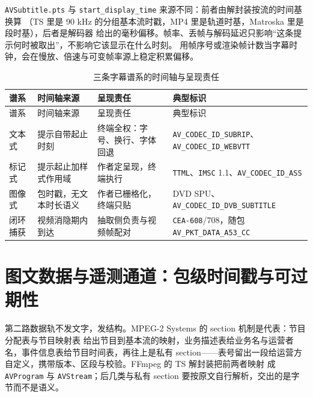 \documentclass[12pt,a4paper,fontset=fandol]{ctexbook}
\newcommand{\Tp}[1]{\texttt{#1}}
\newcommand{\Bk}{\discretionary{}{}{}}
\begin{document}
\begin{warning}[title={字幕的时间基来自容器，不来自帧}]
\Tp{AVSubtitle.pts} 与 \Tp{start\_display\_time} 来源不同：前者由解封装按流的时间基换算
（TS 里是 90 kHz 的分组基本流时戳，MP4 里是轨道时基，Matroska 里是段时基），后者是解码器
给出的毫秒偏移。帧率、丢帧与解码延迟只影响``这条提示何时被取出''，不影响它该显示在什么时刻。
用帧序号或渲染帧计数当字幕时钟，会在慢放、倍速与可变帧率源上稳定积累偏移。
\end{warning}

\begin{longtable}{@{}>{\raggedright\arraybackslash\footnotesize}p{} >{\raggedright\arraybackslash\footnotesize}p{} >{\raggedright\arraybackslash\footnotesize}p{} >{\raggedright\arraybackslash\footnotesize}p{}@{}}
\caption{三条字幕谱系的时间轴与呈现责任}\label{tab:ch15-lineage} \\
\toprule
谱系 & 时间轴来源 & 呈现责任 & 典型标识 \\
\midrule
\endfirsthead
\toprule
谱系 & 时间轴来源 & 呈现责任 & 典型标识 \\
\midrule
\endhead
\bottomrule
\endfoot
\endlastfoot
文本式 & 提示自带起止时刻 & 终端全权：字号、换行、字体回退 & \Tp{AV{\Bk}\_CODEC{\Bk}\_ID{\Bk}\_SUBRIP}、\Tp{AV{\Bk}\_CODEC{\Bk}\_ID{\Bk}\_WEBVTT} \\
标记式 & 提示起止加样式作用域 & 作者定呈现，终端执行 & \Tp{TTML}、\Tp{IMSC} 1.1、\Tp{AV{\Bk}\_CODEC{\Bk}\_ID{\Bk}\_ASS} \\
图像式 & 包时戳，无文本时长语义 & 作者已栅格化，终端只贴 & DVD SPU、\Tp{AV{\Bk}\_CODEC{\Bk}\_ID{\Bk}\_DVB{\Bk}\_SUBTITLE} \\
闭环捕获 & 视频消隐期内到达 & 抽取侧负责与视频帧配对 & \Tp{CEA-608}/708，随包 \Tp{AV{\Bk}\_PKT{\Bk}\_DATA{\Bk}\_A53{\Bk}\_CC} \\
\end{longtable}

\section{图文数据与遥测通道：包级时间戳与可过期性}
\label{sec:ch15-data-sections}

第二路数据轨不发文字，发结构。MPEG-2 Systems 的 section 机制是代表：节目分配表与节目映射表
给出节目到基本流的映射，业务描述表给业务名与运营者名，事件信息表给节目时间表，再往上是私有
section——表号留出一段给运营方自定义，携带版本、区段与校验。FFmpeg 的 TS 解封装把前两者映射
成 \Tp{AVProgram} 与 \Tp{AVStream}；后几类与私有 section 要按原文自行解析，交出的是字节而不是语义。
\end{document}

